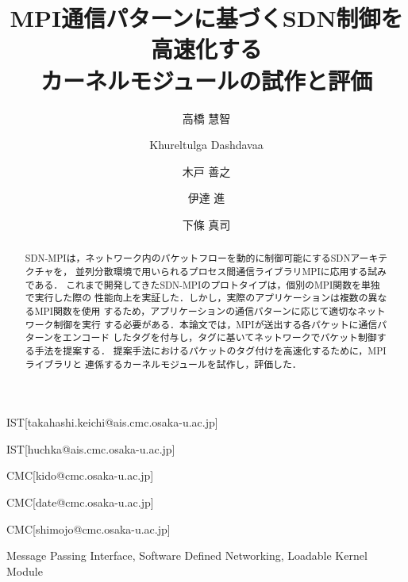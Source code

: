 \documentclass[submit,techrep,noauthor]{ipsj}
\begin{document}
\title{MPI通信パターンに基づくSDN制御を高速化する\\
    カーネルモジュールの試作と評価}



\author{高橋 慧智}{}{IST}[takahashi.keichi@ais.cmc.osaka-u.ac.jp]
\author{Khureltulga Dashdavaa}{}{IST}[huchka@ais.cmc.osaka-u.ac.jp]
\author{木戸 善之}{}{CMC}[kido@cmc.osaka-u.ac.jp]
\author{伊達 進}{}{CMC}[date@cmc.osaka-u.ac.jp]
\author{下條 真司}{}{CMC}[shimojo@cmc.osaka-u.ac.jp]

\begin{abstract}
SDN-MPIは，ネットワーク内のパケットフローを動的に制御可能にするSDNアーキテクチャを，
並列分散環境で用いられるプロセス間通信ライブラリMPIに応用する試みである．
これまで開発してきたSDN-MPIのプロトタイプは，個別のMPI関数を単独で実行した際の
性能向上を実証した．しかし，実際のアプリケーションは複数の異なるMPI関数を使用
するため，アプリケーションの通信パターンに応じて適切なネットワーク制御を実行
する必要がある．本論文では，MPIが送出する各パケットに通信パターンをエンコード
したタグを付与し，タグに基いてネットワークでパケット制御する手法を提案する．
提案手法におけるパケットのタグ付けを高速化するために，MPIライブラリと
連係するカーネルモジュールを試作し，評価した．
\end{abstract}

\begin{jkeyword}
Message Passing Interface, Software Defined Networking, Loadable Kernel Module
\end{jkeyword}

\maketitle








\end{document}
